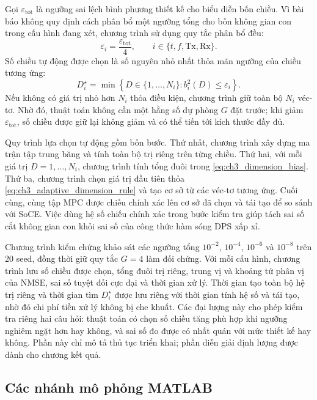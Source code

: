 Gọi \(\varepsilon_{\mathrm{tot}}\) là ngưỡng sai lệch bình phương thiết kế cho biểu diễn bốn chiều. Vì bài báo không quy định cách phân bổ một ngưỡng tổng cho bốn không gian con trong cấu hình đang xét, chương trình sử dụng quy tắc phân bổ đều:
\begin{equation}
\varepsilon_i
=\frac{\varepsilon_{\mathrm{tot}}}{4},
\qquad
i\in\{t,f,\mathrm{Tx},\mathrm{Rx}\}.
\label{eq:ch3_dimension_error_allocation}
\end{equation}
Số chiều tự động được chọn là số nguyên nhỏ nhất thỏa mãn ngưỡng của chiều tương ứng:
\begin{equation}
D_i^{\star}
=
\min\left\{
D\in\{1,\ldots,N_i\}:
b_i^2(D)\leq\varepsilon_i
\right\}.
\label{eq:ch3_adaptive_dimension_rule}
\end{equation}
Nếu không có giá trị nhỏ hơn \(N_i\) thỏa điều kiện, chương trình giữ toàn bộ \(N_i\) véc-tơ. Nhờ đó, thuật toán không cần một hằng số dự phòng \(G\) đặt trước; khi giảm \(\varepsilon_{\mathrm{tot}}\), số chiều được giữ lại không giảm và có thể tiến tới kích thước đầy đủ.

Quy trình lựa chọn tự động gồm bốn bước. Thứ nhất, chương trình xây dựng ma trận tập trung băng và tính toàn bộ trị riêng trên từng chiều. Thứ hai, với mỗi giá trị \(D=1,\ldots,N_i\), chương trình tính tổng đuôi trong \eqref{eq:ch3_dimension_bias}. Thứ ba, chương trình chọn giá trị đầu tiên thỏa \eqref{eq:ch3_adaptive_dimension_rule} và tạo cơ sở từ các véc-tơ tương ứng. Cuối cùng, cùng tập MPC được chiếu chính xác lên cơ sở đã chọn và tái tạo để so sánh với SoCE. Việc dùng hệ số chiếu chính xác trong bước kiểm tra giúp tách sai số cắt không gian con khỏi sai số của công thức hàm sóng DPS xấp xỉ.

Chương trình kiểm chứng khảo sát các ngưỡng tổng \(10^{-2}\), \(10^{-4}\), \(10^{-6}\) và \(10^{-8}\) trên 20 seed, đồng thời giữ quy tắc \(G=4\) làm đối chứng. Với mỗi cấu hình, chương trình lưu số chiều được chọn, tổng đuôi trị riêng, trung vị và khoảng tứ phân vị của NMSE, sai số tuyệt đối cực đại và thời gian xử lý. Thời gian tạo toàn bộ hệ trị riêng và thời gian tìm \(D_i^{\star}\) được lưu riêng với thời gian tính hệ số và tái tạo, nhờ đó chi phí tiền xử lý không bị che khuất. Các đại lượng này cho phép kiểm tra riêng hai câu hỏi: thuật toán có chọn số chiều tăng phù hợp khi ngưỡng nghiêm ngặt hơn hay không, và sai số đo được có nhất quán với mức thiết kế hay không. Phần này chỉ mô tả thủ tục triển khai; phần diễn giải định lượng được dành cho chương kết quả.

\subsection{Các nhánh mô phỏng MATLAB}
\label{subsec:ch3_simulation_branches}

